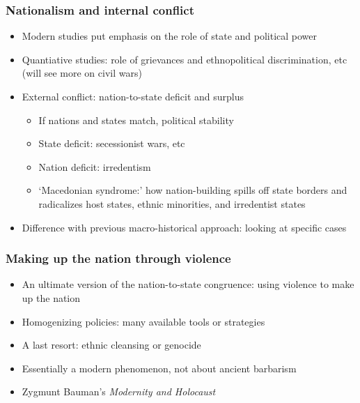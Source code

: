 \documentclass[aspectratio=43]{beamer}
\begin{document}
\begin{frame}
\frametitle{Nationalism and internal conflict}
\centering

\begin{itemize}[<+->]
  \item Modern studies put emphasis on the role of state and political power
  \item Quantiative studies: role of grievances and ethnopolitical discrimination, etc (will see more on civil wars)
  \item External conflict: nation-to-state deficit and surplus
  \begin{itemize}
    \item If nations and states match, political stability
    \item State deficit: secessionist wars, etc
    \item Nation deficit: irredentism
    \item `Macedonian syndrome:' how nation-building spills off state borders and radicalizes host states, ethnic minorities, and irredentist states
  \end{itemize}
  \item Difference with previous macro-historical approach: looking at specific cases
\end{itemize}

\end{frame}

\begin{frame}
\frametitle{Making up the nation through violence}
\centering

\begin{itemize}[<+->]
  \item An ultimate version of the nation-to-state congruence: using violence to make up the nation
  \item Homogenizing policies: many available tools or strategies
  \item A last resort: ethnic cleansing or genocide
  \item Essentially a modern phenomenon, not about ancient barbarism
  \item Zygmunt Bauman's \textit{Modernity and Holocaust}
\end{itemize}

\end{frame}
\end{document}
